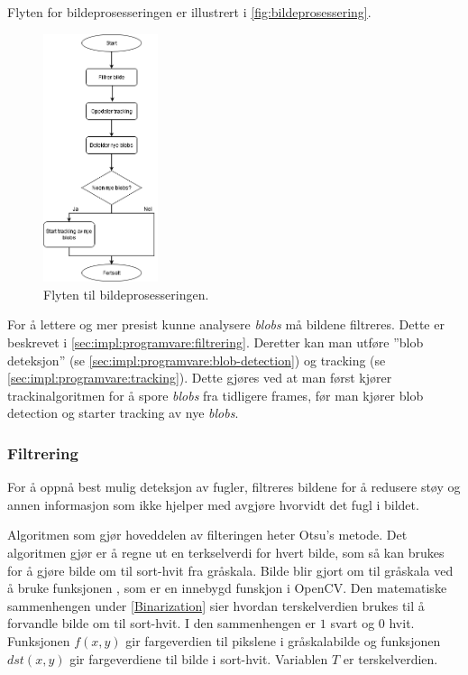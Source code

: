 Flyten for bildeprosesseringen er illustrert i \autoref{fig:bildeprosessering}.

\begin{figure}[H]
    \centering
    \includegraphics[width=0.3\textwidth]{implementering/Program/bildepros.png}
    \caption{Flyten til bildeprosesseringen.}
    \label{fig:bildeprosessering}
\end{figure}

For å lettere og mer presist kunne analysere \textit{blobs} må bildene filtreres. 
Dette er beskrevet i \autoref{sec:impl:programvare:filtrering}. 
Deretter kan man utføre ''blob deteksjon'' (se \autoref{sec:impl:programvare:blob-detection}) og tracking (se \autoref{sec:impl:programvare:tracking}). 
Dette gjøres ved at man først kjører trackinalgoritmen for å spore \textit{blobs} fra tidligere frames, før man kjører blob detection og starter tracking av nye \textit{blobs}. 

\subsubsection{Filtrering}\label{sec:impl:programvare:filtrering}

For å oppnå best mulig deteksjon av fugler, filtreres bildene for å redusere støy og annen informasjon som ikke hjelper med avgjøre hvorvidt det fugl i bildet. 

Algoritmen som gjør hoveddelen av filteringen heter Otsu's metode\cite{otsu}. 
Det algoritmen gjør er å regne ut en terkselverdi for hvert bilde, som så kan brukes for å gjøre bilde om til sort-hvit fra gråskala. 
Bilde blir gjort om til gråskala ved å bruke funksjonen , som er en innebygd funskjon i OpenCV. 
Den matematiske sammenhengen under \eqref{Binarization} sier hvordan terskelverdien brukes til å forvandle bilde om til sort-hvit. 
I den sammenhengen er $1$ svart og $0$ hvit. 
Funksjonen $f(x,y)$ gir fargeverdien til pikslene i gråskalabilde og funksjonen $dst(x,y)$ gir fargeverdiene til bilde i sort-hvit. 
Variablen $T$ er terskelverdien. 



